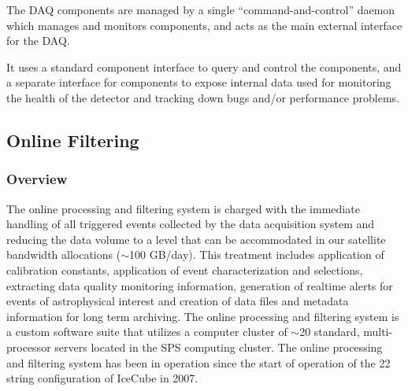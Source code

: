 The DAQ components are managed by a single ``command-and-control'' daemon
which manages and monitors components, and acts as the main
external interface for the DAQ.

It uses a standard component interface to query and
control the components, and a separate interface for components to expose
internal data used for monitoring the health of the detector and tracking
down bugs and/or performance problems.




\subsection{\label{sect:online:filter}Online Filtering}

\subsubsection{Overview}
The online processing and filtering system is charged with the immediate handling of all triggered events collected by the data
acquisition system and reducing the data volume to a level that can be
accommodated in our satellite bandwidth allocations ($\sim$100 GB/day).
This treatment includes application of calibration constants, application of event characterization and selections,  
extracting data quality monitoring information, generation of realtime alerts for events of astrophysical interest
and creation of data files and metadata information for long term archiving.  The online processing and filtering system
is a custom software suite that utilizes a computer cluster of
$\sim$20 standard, multi-processor servers located in the SPS computing cluster.
The online processing and filtering system has been in operation since the
start of operation of the 22 string configuration of IceCube in 2007.

